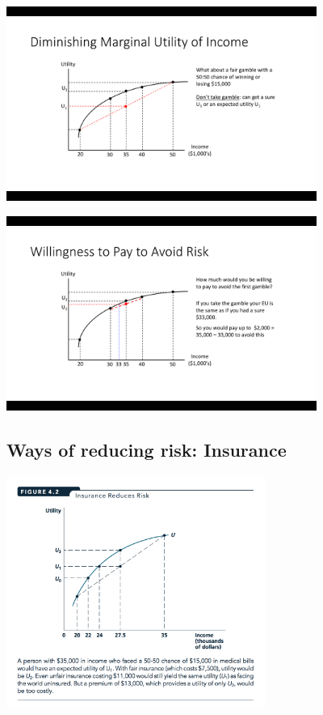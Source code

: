 \documentclass[]{article}
\begin{document}
\includegraphics[height=2.5in]{picsfigs/riskaversion4.png}

\includegraphics[height=2.5in]{picsfigs/riskaversion5a.png}

\hypertarget{ways-of-reducing-risk-insurance}{%
\subsection{Ways of reducing risk: Insurance}\label{ways-of-reducing-risk-insurance}}

\includegraphics[height=3in]{picsfigs/insurancereducesrisk.png}
\end{document}
